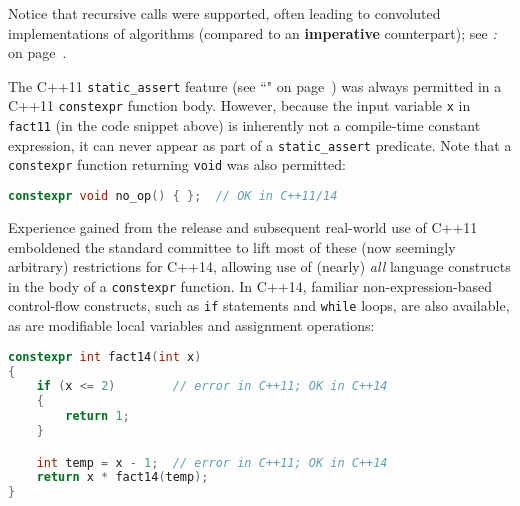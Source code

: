\noindent Notice that recursive calls were supported, often leading to convoluted
implementations of algorithms (compared to an \textbf{imperative}
counterpart); see \textit{: } on page~\pageref{non-recursive-constexpr-algorithms}. 

The C++11 \texttt{static\_assert} feature (see ``" on page~\pageref{compile-time-assertions-(static_assert)}) was always
permitted in a C++11 \texttt{constexpr} function body.
However, because the input variable \texttt{x} in \texttt{fact11}
(in the code snippet above) is inherently not a compile-time constant expression, it can
never appear as part of a \texttt{static\_assert} predicate. Note that a
\texttt{constexpr} function returning \texttt{void} was also permitted:

\begin{lstlisting}[language=C++]
constexpr void no_op() { };  // OK in C++11/14
\end{lstlisting}
    
\noindent Experience gained from the release and subsequent real-world use of
C++11 emboldened the standard committee to lift most of these (now
seemingly arbitrary) restrictions for C++14, allowing use of (nearly)
\emph{all} language constructs in the body of a \texttt{constexpr}
function. In C++14, familiar non-expression-based control-flow
constructs, such as \texttt{if} statements and \texttt{while} loops, are
also available, as are modifiable local variables and assignment
operations:

\begin{lstlisting}[language=C++]
constexpr int fact14(int x)
{
    if (x <= 2)        // error in C++11; OK in C++14
    {
        return 1;
    }

    int temp = x - 1;  // error in C++11; OK in C++14
    return x * fact14(temp);
}
\end{lstlisting}
    
